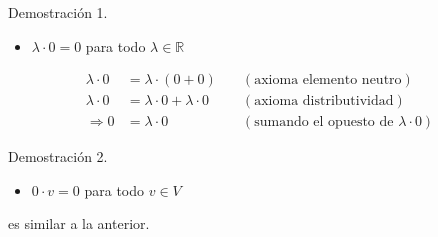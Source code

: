 \documentclass[handout]{beamer} %
\newcommand{\R}{\mathbb R}
\begin{document}
        \begin{frame}
        \begin{block}{Demostración 1.}\pause
        \begin{itemize}
         \item $\lambda\cdot 0=0$ para todo $\lambda\in \R$ 
        \end{itemize}
        \begin{align*}
        \lambda\cdot 0&= \lambda\cdot (0+0)&\quad (\mbox{axioma elemento neutro})\\
        \lambda\cdot 0&=\lambda\cdot 0+\lambda\cdot 0
        &\quad (\mbox{axioma distributividad})\\
        \Rightarrow 0&=\lambda\cdot0
        &\quad (\mbox{sumando el opuesto de $\lambda\cdot 0$})
        \end{align*}
        
    \end{block}
    \pause
    \begin{block}{Demostración 2.}\pause
        \begin{itemize}
         \item $0\cdot v=0$ para todo $v\in V$
        \end{itemize}
         es similar a la anterior. 
        \end{block}
        \end{frame}
        

        \begin{frame}
        
        \end{frame}
        
\end{document}
